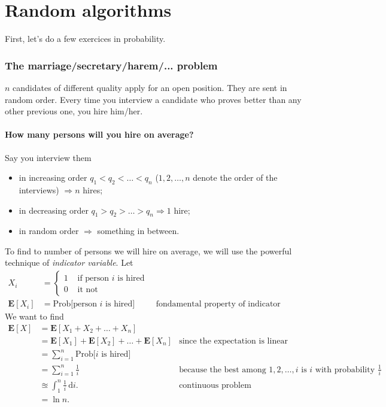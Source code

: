 \part{Random algorithms}

First, let's do a few exercices in probability.



\section{The marriage/secretary/harem/... problem}
$n$ candidates of different quality apply for an open position. They are sent in random order. Every time you interview a candidate who proves better than any other previous one, you hire him/her.

\subsection{How many persons will you hire on average?}
Say you interview them 
\begin{itemize}
\item in increasing order $q_1 < q_2 < \ldots < q_n$ ($1,2, \ldots, n$ denote the order of the interviews) $\Rightarrow n$ hires;
\item in decreasing order $q_1 > q_2 > \ldots > q_n \Rightarrow 1$ hire;
\item in random order $\Rightarrow$ something in between.
\end{itemize}
To find to number of persons we will hire on average, we will use the powerful technique of \textit{indicator variable}. Let
\begin{align*}
X_i &=
  \left\{
      \begin{aligned}
      	1 &\text{ if person $i$ is hired} \\
        0 &\text{ it not }
      \end{aligned}
    \right.\\
\mathbf{E}[X_i] &= \text{Prob[person $i$ is hired}] &\text{ fondamental property of indicator variable}
\end{align*}
We want to find
\begin{align*}
\mathbf{E}[X] &=  \mathbf{E}[X_1+X_2+\ldots+X_n] & \\
&=  \mathbf{E}[X_1] + \mathbf{E}[X_2] + \ldots +\mathbf{E}[X_n]  &\text{since the expectation is linear}\\
&= \sum_{i=1}^n \text{Prob[$i$ is hired]} &\\
&= \sum_{i=1}^n \frac{1}{i} &\text{because the best among $1,2,\ldots,i$ is $i$ with probability $\frac{1}{i}$}\\
&\approxeq \int_1^n \frac{1}{i}  \, \mathrm{d}i. &\text{continuous problem}\\
&= \ln n. &
\end{align*}

